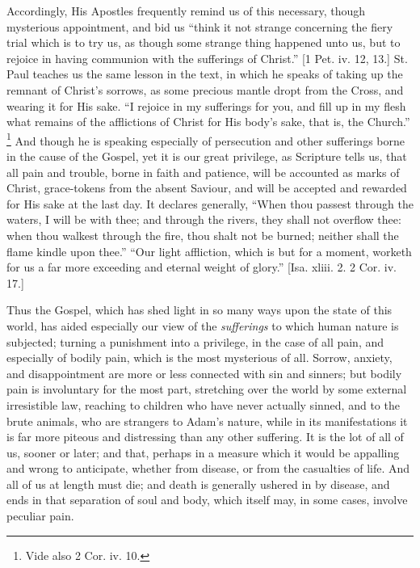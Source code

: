Accordingly, His Apostles frequently remind us of this necessary,
though mysterious appointment, and bid us ``think it not strange
concerning the fiery trial which is to try us, as though some strange
thing happened unto us, but to rejoice in having communion with the
sufferings of Christ.'' [1 Pet. iv. 12, 13.] St. Paul teaches us
the same lesson in the text, in which he speaks of taking up the remnant of Christ's sorrows, as some precious mantle dropt from the
Cross, and wearing it for His sake. ``I rejoice in my sufferings
for you, and fill up in my flesh what remains of the afflictions of
Christ for His body's sake, that is, the Church.'' \footnote{Vide also 2 Cor. iv. 10.} And though he is speaking especially of persecution and other
sufferings borne in the cause of the Gospel, yet it is our great
privilege, as Scripture tells us, that all pain and trouble, borne in
faith and patience, will be accounted as marks of Christ, grace-tokens
from the absent Saviour, and will be accepted and rewarded for His
sake at the last day. It declares generally, ``When thou passest
through the waters, I will be with thee; and through the rivers, they
shall not overflow thee: when thou walkest through the fire, thou
shalt not be burned; neither shall the flame kindle upon thee.''
``Our light affliction, which is but for a moment, worketh for us
a far more exceeding and eternal weight of glory.'' [Isa. xliii.
2. 2 Cor. iv. 17.]

Thus the Gospel, which has shed light in so many ways upon the
state of this world, has aided especially our view of the \emph{sufferings}
to which human nature is subjected; turning a punishment into a
privilege, in the case of all pain, and especially of bodily pain,
which is the most mysterious of all. Sorrow, anxiety, and
disappointment are more or less connected with sin and sinners; but
bodily pain is involuntary for the most part, stretching over the
world by some external irresistible law, reaching to children who have
never actually sinned, and to the brute animals, who are strangers to
Adam's nature, while in its manifestations it is far more piteous and
distressing than any other suffering. It is the lot of all of us,
sooner or later; and that, perhaps in a measure which it would be
appalling and wrong to anticipate, whether from disease, or from the
casualties of life. And all of us at length must die; and death is
generally ushered in by disease, and ends in that separation of soul
and body, which itself may, in some cases, involve peculiar pain.

